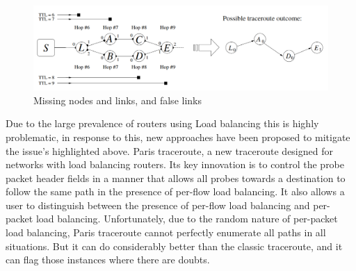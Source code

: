 \begin{figure}[h!!]
  \begin{center}
    \includegraphics[scale=0.3]{images/missing_nodes.png}
    \caption{Missing nodes and links, and false links \cite{anomalies}}
    \label{figure:missing_node_fig}
  \end{center}
\end{figure}



Due to the large prevalence of routers using Load balancing this is highly problematic, in response to this, new approaches have been proposed to mitigate the issue's highlighted above.
Paris traceroute, a new traceroute designed
for networks with load balancing routers. Its key innovation is to control the probe packet header fields in a manner that allows all probes towards a destination to follow the same path in the presence of per-flow load balancing. It also allows a user to distinguish between the presence of per-flow load balancing and per-packet load balancing. Unfortunately, due to the random nature of per-packet load balancing, Paris traceroute cannot perfectly enumerate all paths in all situations. But it can do considerably better than the classic traceroute, and it can flag those instances
where there are doubts. \cite{anomalies}

